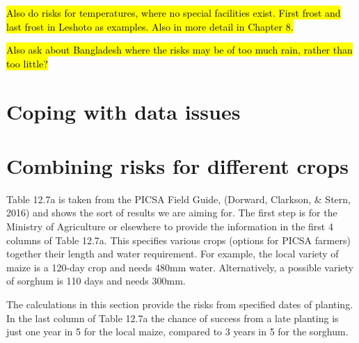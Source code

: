 \documentclass[
  letterpaper,
  DIV=11,
  numbers=noendperiod]{scrreprt}
\begin{document}
\hl{Also do risks for temperatures, where no special facilities exist.
First frost and last frost in Leshoto as examples. Also in more detail
in Chapter 8.}

\hl{Also ask about Bangladesh where the risks may be of too much rain,
rather than too little?}

\section{Coping with data issues}\label{coping-with-data-issues}

\section{Combining risks for different
crops}\label{combining-risks-for-different-crops}

Table 12.7a is taken from the PICSA Field Guide, (Dorward, Clarkson, \&
Stern, 2016) and shows the sort of results we are aiming for. The first
step is for the Ministry of Agriculture or elsewhere to provide the
information in the first 4 columns of Table 12.7a. This specifies
various crops (options for PICSA farmers) together their length and
water requirement. For example, the local variety of maize is a 120-day
crop and needs 480mm water. Alternatively, a possible variety of sorghum
is 110 days and needs 300mm.

The calculations in this section provide the risks from specified dates
of planting. In the last column of Table 12.7a the chance of success
from a late planting is just one year in 5 for the local maize, compared
to 3 years in 5 for the sorghum.
\end{document}
